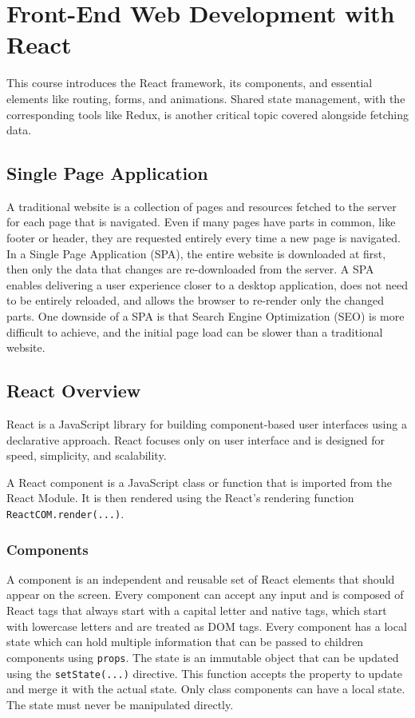 \section*{Front-End Web Development with React}

This course introduces the React framework, its components, and essential elements like routing, forms, and animations. Shared state management, with the corresponding tools like Redux, is another critical topic covered alongside fetching data.

\subsection*{Single Page Application}
A traditional website is a collection of pages and resources fetched to the server for each page that is navigated. Even if many pages have parts in common, like footer or header, they are requested entirely every time a new page is navigated. In a Single Page Application (SPA), the entire website is downloaded at first, then only the data that changes are re-downloaded from the server. A SPA enables delivering a user experience closer to a desktop application, does not need to be entirely reloaded, and allows the browser to re-render only the changed parts. 
One downside of a SPA is that Search Engine Optimization (SEO) is more difficult to achieve, and the initial page load can be slower than a traditional website.


\subsection*{React Overview}

React is a JavaScript library for building component-based user interfaces using a declarative approach. React focuses only on user interface and is designed for speed, simplicity, and scalability.

A React component is a JavaScript class or function that is imported from the React Module. It is then rendered using the React's rendering function \texttt{ReactCOM.render(...)}.

\subsubsection*{Components}
A component is an independent and reusable set of React elements that should appear on the screen. Every component can accept any input and is composed of React tags that always start with a capital letter and native tags, which start with lowercase letters and are treated as DOM tags.
Every component has a local state which can hold multiple information that can be passed to children components using \texttt{props}. The state is an immutable object that can be updated using the \texttt{setState(...)} directive. This function accepts the property to update and merge it with the actual state. Only class components can have a local state. The state must never be manipulated directly.

